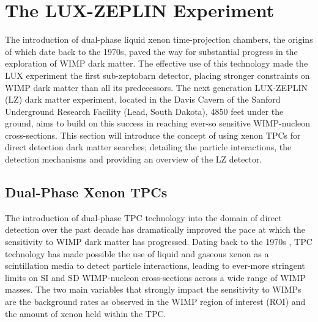 \chapter{The LUX-ZEPLIN Experiment}
\label{chap:chap2}

The introduction of dual-phase liquid xenon time-projection chambers, the origins of which date back to the 1970s, paved the way for substantial progress in the exploration of WIMP dark matter. The effective use of this technology made the LUX experiment the first sub-zeptobarn detector, placing stronger constraints on WIMP dark matter than all its predecessors. The next generation LUX-ZEPLIN (LZ) dark matter experiment, located in the Davis Cavern of the Sanford Underground Research Facility (Lead, South Dakota), 4850 feet under the ground, aims to build on this success in reaching ever-so sensitive WIMP-nucleon cross-sections. This section will introduce the concept of using xenon TPCs for direct detection dark matter searches; detailing the particle interactions, the detection mechanisms and providing an overview of the LZ detector.


\section{Dual-Phase Xenon TPCs}
\label{sec:dualphaseTPC}

The introduction of dual-phase TPC technology into the domain of direct detection over the past decade has dramatically improved the pace at which the sensitivity to WIMP dark matter has progressed. Dating back to the 1970s \cite{tpc_technology}, TPC technology has made possible the use of liquid and gaseous xenon as a scintillation media to detect particle interactions, leading to ever-more stringent limits on SI and SD WIMP-nucleon cross-sections across a wide range of WIMP masses. The two main variables that strongly impact the sensitivity to WIMPs are the background rates as observed in the WIMP region of interest (ROI) and the amount of xenon held within the TPC.

